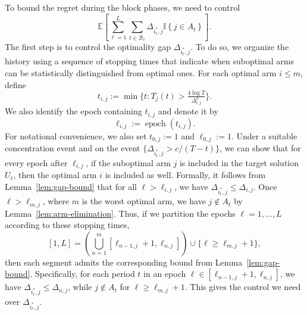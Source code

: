 \documentclass[opre,blindrev]{informs3}
\newcommand{\epoch}{\operatorname{epoch}}
\newcommand{\ind}[1]{\mathbb{I}\left\{#1\right\}}
\newcommand{\bE}[1]{{\mathbb{E}\left[#1\right]}}
\begin{document}
\begin{APPENDICES}
To bound the regret during the block phases, we need to control
\[
    \bE{\sum_{\ell=1}^L \sum_{t\in \mathcal{B}_{\ell}} \Delta_{i_t^*,j} \ind{j\in A_t}}.
\]
The first step is to control the optimality gap \(\Delta_{i_t^*,j}\). To do so, we organize the history using a sequence of stopping times that indicate when suboptimal arms can be statistically distinguished from optimal ones. For each optimal arm \(i \leq m\), define
\begin{equation}\label{eq:main-tij}
    t_{i,j}:=\min\Big\{t: T_j(t)>\tfrac{4\log T}{\Delta_{i,j}^2}\Big\}.
\end{equation}
We also identify the epoch containing \(t_{i,j}\) and denote it by
\[
    \ell_{i,j}:=\epoch(t_{i,j}).
\]
For notational convenience, we also set \(t_{0,j}:=1\) and \(\ell_{0,j}:=1\). 
Under a suitable concentration event and on the event \(\{\Delta_{i_t^*,j}> c/(T-t)\}\), we can show that for every epoch after \(\ell_{i,j}\), if the suboptimal arm \(j\) is included in the target solution \(U_\ell\), then the optimal arm \(i\) is included as well. Formally, it follows from Lemma~\ref{lem:gap-bound} that for all \(\ell>\ell_{i,j}\), we have \(\Delta_{i_t^*,j} \le \Delta_{i,j}\). Once \(\ell>\ell_{m,j}\), where \(m\) is the worst optimal arm, we have \(j\notin A_t\) by Lemma~\ref{lem:arm-elimination}. Thus, if we partition the epochs \(\ell=1,\dots,L\) according to these stopping times,
\[
    [1,L]=\left(\bigcup_{n=1}^m [\ell_{n-1,j}+1, \ell_{n,j}]\right)\cup \big\{\ell\geq \ell_{m,j}+1\big\},
\]
then each segment admits the corresponding bound from Lemma~\ref{lem:gap-bound}. Specifically, for each period \(t\) in an epoch \(\ell \in [\ell_{n-1,j}+1, \ell_{n,j}]\), we have \(\Delta_{i_t^*,j} \le \Delta_{n,j}\), while \(j\notin A_t\) for \(\ell\geq \ell_{m,j}+1\). This gives the control we need over \(\Delta_{i_t^*,j}\).

\begin{figure}[t]
    \centering
\end{figure}
\end{APPENDICES}
\end{document}
